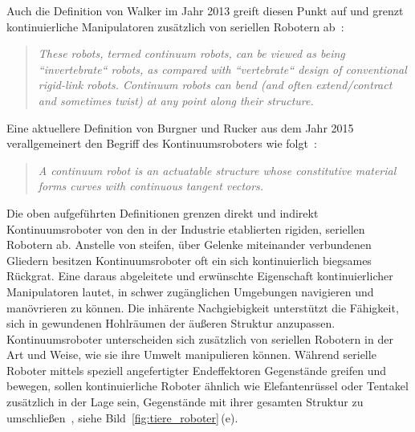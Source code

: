 Auch die Definition von Walker im Jahr 2013 greift diesen Punkt auf und grenzt kontinuierliche Manipulatoren zusätzlich von seriellen Robotern ab~\cite{Wal13}:

\begin{quotation}
\textit{These robots, termed continuum robots, can be viewed as being ``invertebrate`` robots, as compared with ``vertebrate`` design of conventional rigid-link robots. Continuum robots can bend (and often extend/contract and sometimes twist) at any point along their structure.}
\end{quotation}


Eine aktuellere Definition von Burgner und Rucker aus dem Jahr 2015 verallgemeinert den Begriff des Kontinuumsroboters wie folgt~\cite{BRC15}:

\begin{quotation}
\textit{A continuum robot is an actuatable structure whose constitutive material forms curves with continuous tangent vectors.}
\end{quotation}

Die oben aufgeführten Definitionen grenzen direkt und indirekt Kontinuumsroboter von den in der Industrie etablierten rigiden, seriellen Robotern ab. Anstelle von steifen, über Gelenke miteinander verbundenen Gliedern besitzen Kontinuumsroboter oft ein sich kontinuierlich biegsames Rückgrat. Eine daraus abgeleitete und erwünschte Eigenschaft kontinuierlicher Manipulatoren lautet, in schwer zugänglichen Umgebungen navigieren und manövrieren zu können. Die inhärente Nachgiebigkeit unterstützt die Fähigkeit, sich in gewundenen Hohlräumen der äußeren Struktur anzupassen. Kontinuumsroboter unterscheiden sich zusätzlich von seriellen Robotern in der Art und Weise, wie sie ihre Umwelt manipulieren können. Während serielle Roboter mittels speziell angefertigter Endeffektoren Gegenstände greifen und bewegen, sollen kontinuierliche Roboter ähnlich wie Elefantenrüssel oder Tentakel zusätzlich in der Lage sein, Gegenstände mit ihrer gesamten Struktur zu umschließen~\cite{Moc01}, siehe Bild~\ref{fig:tiere_roboter}\,(e).

